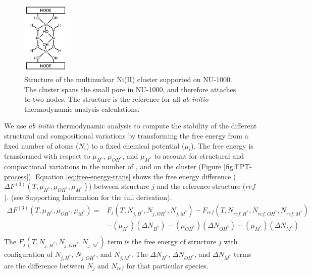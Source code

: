 \documentclass[journal=jctcce,manuscript=article]{achemso}
\begin{document}
\begin{figure}
    \centering
    \includegraphics[width=0.20\textwidth]{zi-images/00-General-Graphics/Reference-structure.png}
    \caption{Structure of the multinuclear Ni(II) cluster supported on NU-1000. The cluster spans the small pore in NU-1000, and therefore attaches to two nodes. The structure is the reference for all \textit{ab initio} thermodynamic analysis calculations.}
    \label{fig:ref_Ni4_structure}
\end{figure}

We use \textit{ab initio} thermodynamic analysis to compute the stability of the different structural and compositional variations by transforming the free energy from a fixed number of atoms ($N_i$) to a fixed chemical potential ($\mu_i$). The free energy is transformed with respect to $\mu_{H^{*}}$, $\mu_{OH^{*}}$, and $\mu_{M^{*}}$ to account for structural and compositional variations in the number of ,  and  on the cluster (Figure \ref{fig:FPT-process}). Equation \ref{eq:free-energy-trans} shows the free energy difference ($\Delta F^{(3)}(T,\mu_{H^{*}},\mu_{OH^{*}},\mu_{M^{*}})$) between structure $j$ and the reference structure ($ref$).  (see Supporting Information for the full derivation).
\begin{equation}
    \begin{split}
        \Delta F^{(3)}(T,\mu_{H^{*}},\mu_{OH^{*}},\mu_{M^{*}})  = 
        & F_{j}(T,N_{j,H^{*}},N_{j,OH^{*}},N_{j,M^{*}}) - 
          F_{ref}(T,N_{ref,H^{*}},N_{ref,OH^{*}},N_{ref,M^{*}}) \\
        & - (\mu_{H^{*}})(\Delta N_{H^{*}}) - (\mu_{OH^{*}})(\Delta N_{OH^{*}}) - (\mu_{M^{*}})(\Delta N_{M^{*}}) \\ 
    \end{split}
    \label{eq:free-energy-trans}
\end{equation}
The $F_{j}(T,N_{j,H^{*}},N_{j,OH^{*}},N_{j,M^{*}})$ term is the free energy of structure $j$ with configuration of $N_{j,H^{*}}$, $N_{j,OH^{*}}$, and $N_{j,M^{*}}$. The $\Delta N_{H^{*}}$, $\Delta N_{OH^{*}}$, and $\Delta N_{M^{*}}$ terms are the difference between $N_{j}$ and $N_{ref}$ for that particular species. 
\end{document}
